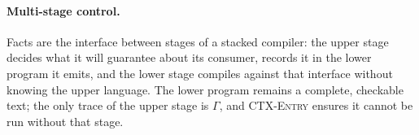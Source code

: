 \paragraph{Multi-stage control.} Facts are the interface between stages of a
stacked compiler: the upper stage decides what it will guarantee about its
consumer, records it in the lower program it emits, and the lower stage
compiles against that interface without knowing the upper language. The
lower program remains a complete, checkable text; the only trace of the
upper stage is $\Gamma$, and \textsc{CTX-Entry} ensures it cannot be run
without that stage.
